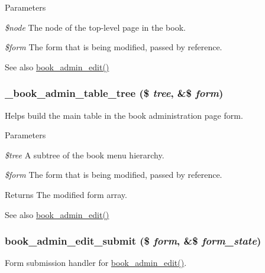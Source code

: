 \begin{DoxyParams}{Parameters}
\item[{\em \$node}]The node of the top-\/level page in the book. \item[{\em \$form}]The form that is being modified, passed by reference.\end{DoxyParams}
\begin{DoxySeeAlso}{See also}
\hyperlink{group__forms_gac3a5a2ff41875baa73d6af357cf328e6}{book\_\-admin\_\-edit()} 
\end{DoxySeeAlso}
\hypertarget{book_8admin_8inc_a67224aa7f69e5f25baca3d08b4b7dc5c}{
\subsubsection[{\_\-book\_\-admin\_\-table\_\-tree}]{\setlength{\rightskip}{0pt plus 5cm}\_\-book\_\-admin\_\-table\_\-tree (\$ {\em tree}, \/  \&\$ {\em form})}}
\label{book_8admin_8inc_a67224aa7f69e5f25baca3d08b4b7dc5c}
Helps build the main table in the book administration page form.


\begin{DoxyParams}{Parameters}
\item[{\em \$tree}]A subtree of the book menu hierarchy. \item[{\em \$form}]The form that is being modified, passed by reference.\end{DoxyParams}
\begin{DoxyReturn}{Returns}
The modified form array.
\end{DoxyReturn}
\begin{DoxySeeAlso}{See also}
\hyperlink{group__forms_gac3a5a2ff41875baa73d6af357cf328e6}{book\_\-admin\_\-edit()} 
\end{DoxySeeAlso}
\hypertarget{book_8admin_8inc_af0fb9b52db15bf3bc44c63d5b9042c69}{
\subsubsection[{book\_\-admin\_\-edit\_\-submit}]{\setlength{\rightskip}{0pt plus 5cm}book\_\-admin\_\-edit\_\-submit (\$ {\em form}, \/  \&\$ {\em form\_\-state})}}
\label{book_8admin_8inc_af0fb9b52db15bf3bc44c63d5b9042c69}
Form submission handler for \hyperlink{group__forms_gac3a5a2ff41875baa73d6af357cf328e6}{book\_\-admin\_\-edit()}.

